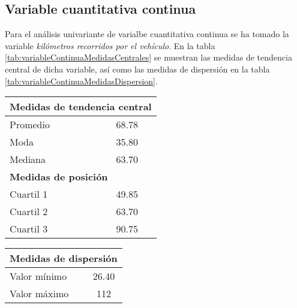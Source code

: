 \subsection*{Variable cuantitativa continua}
Para el análisis univariante de varialbe cuantitativa continua se ha tomado la variable \emph{kilómetros recorridos por el vehículo}. En la tabla \ref{tab:variableContinuaMedidasCentrales} se muestran las medidas de tendencia central de dicha variable, así como las medidas de dispersión en la tabla \ref{tab:variableContinuaMedidasDispersion}.\par
\vspace{2em}
\begin{footnotesize}
    \begin{minipage}[ht]{0.4\textwidth}
        \centering
        \begin{tabular}{lc}
            \toprule
            \multicolumn{2}{l}{\textbf{Medidas de tendencia central}} \\
            \bottomrule
            Promedio & 68.78\\
            \midrule
            Moda & 35.80\\
            \midrule
            Mediana & 63.70\\
            \bottomrule
            \toprule
            \multicolumn{2}{l}{\textbf{Medidas de posición}} \\
            \bottomrule
            Cuartil 1 & 49.85 \\
            \midrule
            Cuartil 2 & 63.70 \\
            \midrule
            Cuartil 3 & 90.75 \\
            \bottomrule
        \end{tabular}
        \label{tab:variableContinuaMedidasCentrales}
    \end{minipage}
    \begin{minipage}[ht]{0.4\textwidth}
        \centering
        \begin{tabular}{lc}
            \toprule
            \multicolumn{2}{l}{\textbf{Medidas de dispersión}} \\
            \bottomrule
            \toprule
            Valor mínimo & 26.40 \\
            \midrule
            Valor máximo & 112 \\

\end{tabular}
\end{minipage}
\end{footnotesize}
